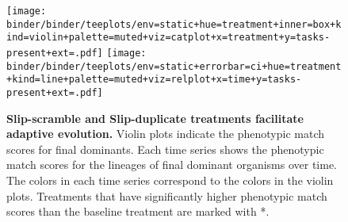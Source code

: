\begin{figure}[!h]
  \texttt{[image: binder/binder/teeplots/env=static+hue=treatment+inner=box+kind=violin+palette=muted+viz=catplot+x=treatment+y=tasks-present+ext=.pdf]}%
   \texttt{[image: binder/binder/teeplots/env=static+errorbar=ci+hue=treatment+kind=line+palette=muted+viz=relplot+x=time+y=tasks-present+ext=.pdf]}

   \vspace{-2ex}

  \caption{\textbf{Slip-scramble and Slip-duplicate treatments facilitate adaptive evolution.}
  \small Violin plots indicate the phenotypic match scores for final dominants.
  Each time series shows the phenotypic match scores for the lineages of final dominant organisms over time. The colors in each time series correspond to the colors in the violin plots.
  Treatments that have significantly higher phenotypic match scores than the baseline treatment are marked with *.  }
  \label{fig:results_panels}
\end{figure}
